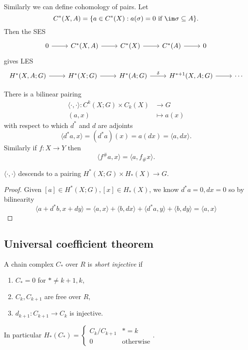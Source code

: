 \documentclass[a4paper]{article}
\begin{document}
Similarly we can define cohomology of pairs. Let
\[
  C^*(X, A) = \{a \in C^*(X): a(\sigma) = 0 \text{ if } \im \sigma \subseteq A\}.
\]
Then the SES
\[
  \begin{tikzcd}
    0 \ar[r] & C^*(X, A) \ar[r] & C^*(X) \ar[r] & C^*(A) \ar[r] & 0
  \end{tikzcd}
\]
gives LES
\[
  \begin{tikzcd}
    H^*(X, A; G) \ar[r] & H^*(X; G) \ar[r] & H^*(A; G) \ar[r, "\delta"] & H^{* + 1}(X, A; G) \ar[r] & \cdots
  \end{tikzcd}
\]

There is a bilinear pairing
\begin{align*}
  \langle \cdot, \cdot \rangle: C^k(X; G) \times C_k(X) &\to G \\
  (a, x) &\mapsto a(x)
\end{align*}
with respect to which \(d^*\) and \(d\) are adjoints
\[
  \langle d^*a, x \rangle = (d^*a)(x) = a(dx) = \langle a, dx \rangle.
\]
Similarly if \(f: X \to Y\) then
\[
  \langle f^\#a, x \rangle = \langle a, f_\# x \rangle.
\]

\begin{lemma}
  \(\langle \cdot, \cdot \rangle\) descends to a pairing \(H^*(X; G) \times H_*(X) \to G\).
\end{lemma}

\begin{proof}
  Given \([a] \in H^*(X; G), [x] \in H_*(X)\), we know \(d^*a = 0, d x = 0\) so by bilinearity
  \[
    \langle a + d^* b, x + dy \rangle
    = \langle a, x \rangle + \langle b, dx \rangle + \langle d^*a, y \rangle + \langle b, d y\rangle
    = \langle a, x \rangle
  \]
\end{proof}

\subsection{Universal coefficient theorem}

\begin{definition}
  A chain complex \(C_*\) over \(R\) is \emph{short injective} if
  \begin{enumerate}
  \item \(C_* = 0\) for \(* \neq k + 1, k\),
  \item \(C_k, C_{k + 1}\) are free over \(R\),
  \item \(d_{k + 1}: C_{k + 1} \to C_k\) is injective.
  \end{enumerate}
\end{definition}
In particular \(H_*(C_*) =
\begin{cases}
  C_k/C_{k + 1} & * = k \\
  0 & \text{otherwise}
\end{cases}
\).
\end{document}
